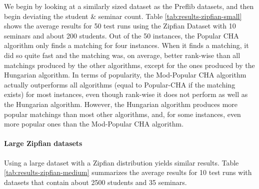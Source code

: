 \begin{table}[h!]
  \centering
  \caption{Average results for small Zipfian dataset with 50 runs}
  \label{tab:results-zipfian-small}
\end{table}

We begin by looking at a similarly sized dataset as the Preflib datasets, and then begin deviating the student \& seminar count. Table \ref{tab:results-zipfian-small} shows the average results for 50 test runs using the Zipfian Dataset with 10 seminars and about 200 students. Out of the 50 instances, the Popular CHA algorithm only finds a matching for four instances. When it finds a matching, it did so quite fast and the matching was, on average, better rank-wise than all matchings produced by the other algorithms, except for the ones produced by the Hungarian algorithm. In terms of popularity, the Mod-Popular CHA algorithm actually outperforms all algorithms (equal to Popular-CHA if the matching exists) for most instances, even though rank-wise it does not perform as well as the Hungarian algorithm. However, the Hungarian algorithm produces more popular matchings than most other algorithms, and, for some instances, even more popular ones than the Mod-Popular CHA algorithm.

\paragraph{Large Zipfian datasets}
Using a large dataset with a Zipfian distribution yields similar results. Table \ref{tab:results-zipfian-medium} summarizes the average results for 10 test runs with datasets that contain about 2500 students and 35 seminars.

